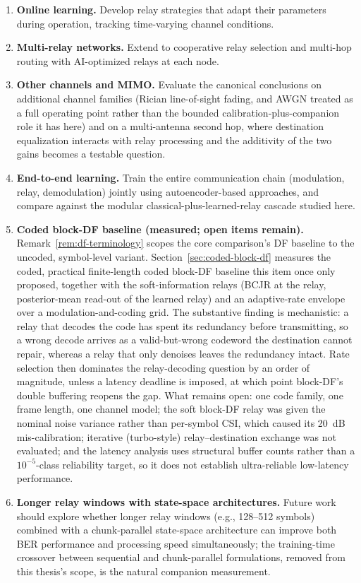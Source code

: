 \begin{enumerate}
\item
  \textbf{Online learning.} Develop relay strategies that adapt their parameters during operation, tracking time-varying channel conditions.
\item
  \textbf{Multi-relay networks.} Extend to cooperative relay selection and multi-hop routing with AI-optimized relays at each node.
\item
  \textbf{Other channels and MIMO.} Evaluate the canonical conclusions on additional channel families (Rician line-of-sight fading, and AWGN treated as a full operating point rather than the bounded calibration-plus-companion role it has here) and on a multi-antenna second hop, where destination equalization interacts with relay processing and the additivity of the two gains becomes a testable question.
\item
  \textbf{End-to-end learning.} Train the entire communication chain (modulation, relay, demodulation) jointly using autoencoder-based approaches, and compare against the modular classical-plus-learned-relay cascade studied here.
\item
  \textbf{Coded block-DF baseline (measured; open items remain).} Remark~\ref{rem:df-terminology} scopes the core comparison's DF baseline to the uncoded, symbol-level variant. Section~\ref{sec:coded-block-df} measures the coded, practical finite-length coded block-DF baseline this item once only proposed, together with the soft-information relays (BCJR at the relay, posterior-mean read-out of the learned relay) and an adaptive-rate envelope over a modulation-and-coding grid. The substantive finding is mechanistic: a relay that decodes the code has spent its redundancy before transmitting, so a wrong decode arrives as a valid-but-wrong codeword the destination cannot repair, whereas a relay that only denoises leaves the redundancy intact. Rate selection then dominates the relay-decoding question by an order of magnitude, unless a latency deadline is imposed, at which point block-DF's double buffering reopens the gap. What remains open: one code family, one frame length, one channel model; the soft block-DF relay was given the nominal noise variance rather than per-symbol CSI, which caused its 20~dB mis-calibration; iterative (turbo-style) relay--destination exchange was not evaluated; and the latency analysis uses structural buffer counts rather than a $10^{-5}$-class reliability target, so it does not establish ultra-reliable low-latency performance.
\item
  \textbf{Longer relay windows with state-space architectures.} Future work should explore whether longer relay windows (e.g., 128--512 symbols) combined with a chunk-parallel state-space architecture can improve both BER performance and processing speed simultaneously; the training-time crossover between sequential and chunk-parallel formulations, removed from this thesis's scope, is the natural companion measurement.
\end{enumerate}

